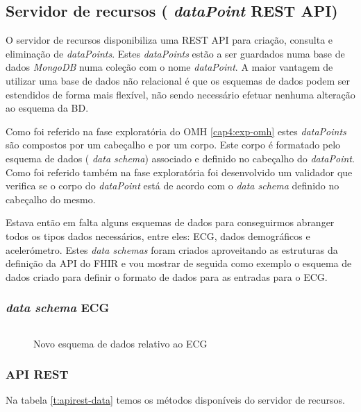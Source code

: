 \subsection{Servidor de recursos ( \textit{dataPoint} REST API) }
O servidor de recursos disponibiliza uma \gls{REST} \gls{API} para criação, consulta e eliminação de  \textit{dataPoints}. Estes  \textit{dataPoints} estão a ser guardados numa base de dados  \textit{MongoDB} numa coleção com o nome  \textit{dataPoint}. A maior vantagem de utilizar uma base de dados não relacional é que os esquemas de dados podem ser estendidos de forma mais flexível, não sendo necessário efetuar nenhuma alteração ao esquema da BD. 
\par 
Como foi referido na fase exploratória do \gls{OMH} \ref{cap4:exp-omh} estes  \textit{dataPoints} são compostos por um cabeçalho e por um corpo. Este corpo é formatado pelo esquema de dados ( \textit{data schema}) associado e definido no cabeçalho do  \textit{dataPoint}. Como foi referido também na fase exploratória foi desenvolvido um validador que verifica se o corpo do  \textit{dataPoint} está de acordo com o  \textit{data schema} definido no cabeçalho do mesmo. \par
Estava então em falta alguns esquemas de dados para conseguirmos abranger todos os tipos dados necessários, entre eles: \gls{ECG}, dados demográficos e acelerómetro. Estes  \textit{data schemas} foram criados aproveitando as estruturas da definição da \gls{API} do \gls{FHIR} e vou mostrar de seguida como exemplo o esquema de dados criado para definir o formato de dados para as entradas para o \gls{ECG}. \newpage
\subsubsection{ \textit{data schema} ECG}
\begin{figure}[H]
\inputminted[fontsize=\scriptsize]{json}{code/ecg.json}
\caption[Novo esquema de dados relativo ao ECG]{Novo esquema de dados relativo ao ECG}
\label{f:ecgjsonschema}
\end{figure}

\subsubsection{API REST}
Na tabela \ref{t:apirest-data} temos os métodos disponíveis do servidor de recursos.
\label{l:restapiRESOURCES}

